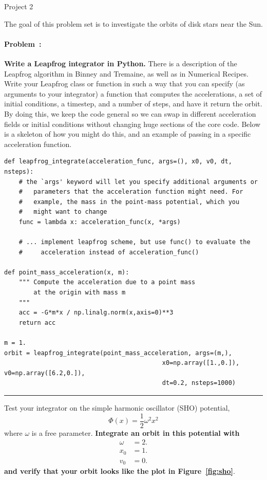 \documentclass[12pt,twoside]{article}
\newcommand{\projectname}[1]{\begin{center} {\huge {#1}} \end{center}}
\newcommand{\problemname}{Problem}
\newcounter{problem}
\newenvironment{problem}{\paragraph{\problemname~\theproblem:}\refstepcounter{problem}}{}
\begin{document}
\projectname{Project 2}

The goal of this problem set is to investigate the orbits of disk stars near the Sun. 

\begin{problem} 
{\bf Write a Leapfrog integrator in Python.} There is a description of the Leapfrog algorithm in Binney and Tremaine, as well as in Numerical Recipes.  Write your Leapfrog class or function in such a way that you can specify (as arguments to your integrator) a function that computes the accelerations, a set of initial conditions, a timestep, and a number of steps, and have it return the orbit. By doing this, we keep the code general so we can swap in different acceleration fields or initial conditions without changing huge sections of the core code. Below is a skeleton of how you might do this, and an example of passing in a specific acceleration function.

\begin{verbatim}
def leapfrog_integrate(acceleration_func, args=(), x0, v0, dt, nsteps):
    # the `args' keyword will let you specify additional arguments or
    #	parameters that the acceleration function might need. For
    #	example, the mass in the point-mass potential, which you 
    #	might want to change
    func = lambda x: acceleration_func(x, *args)
    
    # ... implement leapfrog scheme, but use func() to evaluate the 
    #     acceleration instead of acceleration_func()

def point_mass_acceleration(x, m):
    """ Compute the acceleration due to a point mass 
        at the origin with mass m 
    """
    acc = -G*m*x / np.linalg.norm(x,axis=0)**3
    return acc
    
m = 1.
orbit = leapfrog_integrate(point_mass_acceleration, args=(m,),
				                           x0=np.array([1.,0.]), v0=np.array([6.2,0.]),
				                           dt=0.2, nsteps=1000)
\end{verbatim}

\noindent\hfil\rule{0.5\textwidth}{.4pt}\hfil

\vspace{2em}

Test your integrator on the simple harmonic oscillator (SHO) potential,
\begin{equation}
	\Phi(x) = \frac{1}{2}\omega^2 x^2
\end{equation}
where $\omega$ is a free parameter. {\bf Integrate an orbit in this potential with}
\begin{align}
	\omega &= 2.\\
	x_0 &= 1.\\
	v_0 &= 0.
\end{align}
{\bf and verify that your orbit looks like the plot in Figure~\ref{fig:sho}}.


\end{problem}
\end{document}
